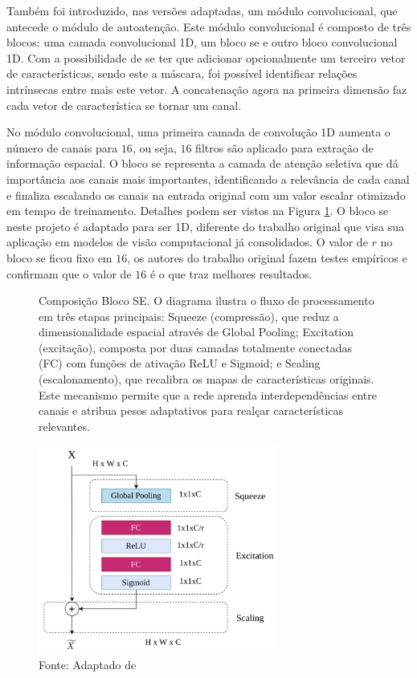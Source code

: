 Também foi introduzido, nas versões adaptadas, um módulo convolucional, que antecede o módulo de autoatenção. Este módulo convolucional é composto de três blocos: uma camada convolucional 1D, um bloco \gls{se} e outro bloco convolucional 1D. Com a possibilidade de se ter que adicionar opcionalmente um terceiro vetor de características, sendo este a máscara, foi possível identificar relações intrínsecas entre mais este vetor. A concatenação agora na primeira dimensão faz cada vetor de característica se tornar um canal. 

No módulo convolucional, uma primeira camada de convolução 1D aumenta o número de canais para $16$, ou seja, $16$ filtros são aplicado para extração de informação espacial. O bloco \gls{se} representa a camada de atenção seletiva que dá importância aos canais mais importantes, identificando a relevância de cada canal e finaliza escalando os canais na entrada original com um valor escalar otimizado em tempo de treinamento. Detalhes podem ser vistos na Figura \ref{fig:fig031}. O bloco \gls{se} neste projeto é adaptado para ser 1D, diferente do trabalho original que visa sua aplicação em modelos de visão computacional já consolidados. O valor de $r$ no bloco \gls{se} ficou fixo em $16$, os autores do trabalho original fazem testes empíricos e confirmam que o valor de $16$ é o que traz melhores resultados.

\begin{figure}[h!]
    \centering
    \captionsetup{width=0.98\textwidth, justification=justified}
    \caption{Composição Bloco SE. O diagrama ilustra o fluxo de processamento em três etapas principais: Squeeze (compressão), que reduz a dimensionalidade espacial através de Global Pooling; Excitation (excitação), composta por duas camadas totalmente conectadas (FC) com funções de ativação ReLU e Sigmoid; e Scaling (escalonamento), que recalibra os mapas de características originais. Este mecanismo permite que a rede aprenda interdependências entre canais e atribua pesos adaptativos para realçar características relevantes.
    }
    \includegraphics[width=0.7\textwidth]{figures/fig031.png}
    \caption*{Fonte: Adaptado de \cite{lafraxoSEDARUnetSqueezeexcitationDilated2024}}
    \label{fig:fig031}
\end{figure}



